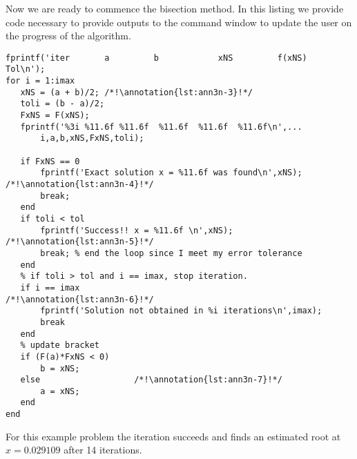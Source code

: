 Now we are ready to commence the bisection method.  In this listing we provide code necessary to provide outputs to the command window to update the user on the progress of the algorithm.
\begin{lstlisting}[name=lec3n-ex, style=myMatlab]
fprintf('iter       a         b            xNS         f(xNS)         Tol\n');
for i = 1:imax
   xNS = (a + b)/2; /*!\annotation{lst:ann3n-3}!*/
   toli = (b - a)/2;
   FxNS = F(xNS);
   fprintf('%3i %11.6f %11.6f  %11.6f  %11.6f  %11.6f\n',...
       i,a,b,xNS,FxNS,toli);
  
   if FxNS == 0
       fprintf('Exact solution x = %11.6f was found\n',xNS); /*!\annotation{lst:ann3n-4}!*/
       break;
   end   
   if toli < tol
       fprintf('Success!! x = %11.6f \n',xNS); /*!\annotation{lst:ann3n-5}!*/
       break; % end the loop since I meet my error tolerance
   end   
   % if toli > tol and i == imax, stop iteration.
   if i == imax                                        /*!\annotation{lst:ann3n-6}!*/
       fprintf('Solution not obtained in %i iterations\n',imax); 
       break
   end   
   % update bracket
   if (F(a)*FxNS < 0)
       b = xNS;
   else                   /*!\annotation{lst:ann3n-7}!*/
       a = xNS;
   end    
end

\end{lstlisting}
For this example problem the iteration succeeds and finds an estimated root at $x = 0.029109$ after 14 iterations.
